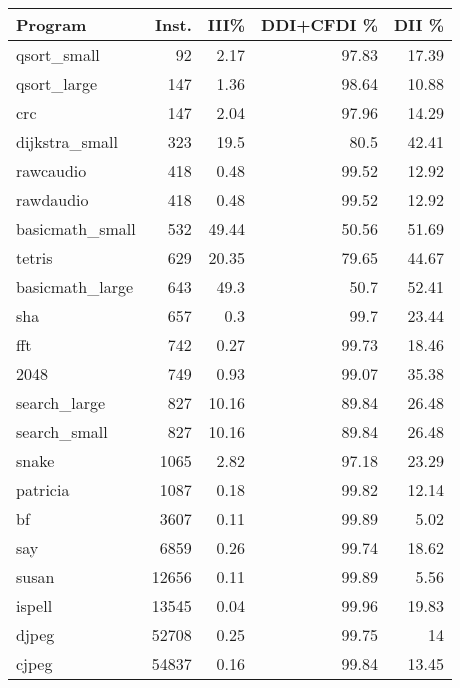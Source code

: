 \begin{tabular}{lrrrr}
\hline
 Program         &   Inst. &   III\% &   DDI+CFDI \% &   DII \% \\
\hline
 qsort\_small     &      92 &   2.17 &        97.83 &   17.39 \\
 qsort\_large     &     147 &   1.36 &        98.64 &   10.88 \\
 crc             &     147 &   2.04 &        97.96 &   14.29 \\
 dijkstra\_small  &     323 &  19.5  &        80.5  &   42.41 \\
 rawcaudio       &     418 &   0.48 &        99.52 &   12.92 \\
 rawdaudio       &     418 &   0.48 &        99.52 &   12.92 \\
 basicmath\_small &     532 &  49.44 &        50.56 &   51.69 \\
 tetris          &     629 &  20.35 &        79.65 &   44.67 \\
 basicmath\_large &     643 &  49.3  &        50.7  &   52.41 \\
 sha             &     657 &   0.3  &        99.7  &   23.44 \\
 fft             &     742 &   0.27 &        99.73 &   18.46 \\
 2048            &     749 &   0.93 &        99.07 &   35.38 \\
 search\_large    &     827 &  10.16 &        89.84 &   26.48 \\
 search\_small    &     827 &  10.16 &        89.84 &   26.48 \\
 snake           &    1065 &   2.82 &        97.18 &   23.29 \\
 patricia        &    1087 &   0.18 &        99.82 &   12.14 \\
 bf              &    3607 &   0.11 &        99.89 &    5.02 \\
 say             &    6859 &   0.26 &        99.74 &   18.62 \\
 susan           &   12656 &   0.11 &        99.89 &    5.56 \\
 ispell          &   13545 &   0.04 &        99.96 &   19.83 \\
 djpeg           &   52708 &   0.25 &        99.75 &   14    \\
 cjpeg           &   54837 &   0.16 &        99.84 &   13.45 \\
\hline
\end{tabular}\begin{tabular}{lrrrrrrrr}

\end{tabular}
